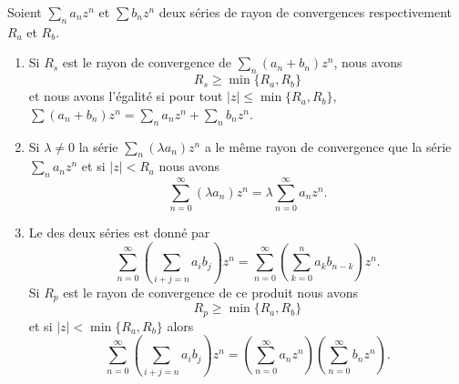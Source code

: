 \begin{theorem}     \label{ThokPTXYC}
    Soient \( \sum_na_nz^n\) et \( \sum b_nz^n\) deux séries de rayon de convergences respectivement \( R_a\) et \( R_b\).
    \begin{enumerate}
        \item   \label{IteWlajij}
            Si \( R_s\) est le rayon de convergence de \( \sum_n(a_n+b_n)z^n\), nous avons
            \begin{equation}
                R_s\geq \min\{ R_a,R_b \}
            \end{equation}
            et nous avons l'égalité si pour tout \( |z |\leq\min\{ R_a,R_b \}\), \( \sum (a_n+b_n)z^n=\sum_n a_nz^n+\sum_nb_nz^n\).
        \item
            Si \( \lambda\neq 0\) la série \( \sum_n(\lambda a_n)z^n\) a le même rayon de convergence que la série \( \sum_na_nz^n\) et si \( | z |<R_a\) nous avons
            \begin{equation}
                \sum_{n=0}^{\infty}(\lambda a_n)z^n=\lambda\sum_{n=0}^{\infty}a_nz^n.
            \end{equation}
        \item
            Le  des deux séries est donné par
            \begin{equation}
                \sum_{n=0}^{\infty}\left( \sum_{i+j=n}a_ib_j \right)z^n=\sum_{n=0}^{\infty}\left( \sum_{k=0}^{n}a_kb_{n-k} \right)z^n.
            \end{equation}
            Si \( R_p\) est le rayon de convergence de ce produit nous avons
            \begin{equation}
                R_p\geq \min\{ R_a,R_b \}
            \end{equation}
            et si \( | z |<\min\{ R_a,R_b \}\) alors
            \begin{equation}
                \sum_{n=0}^{\infty}\left( \sum_{i+j=n}a_ib_j \right)z^n=\left( \sum_{n=0}^{\infty}a_nz^n \right)\left( \sum_{n=0}^{\infty}b_nz^n \right).
            \end{equation}
            
    \end{enumerate}
    
\end{theorem}

